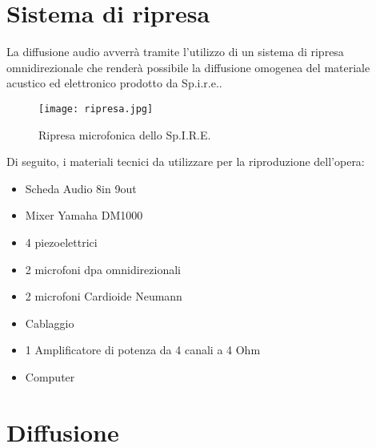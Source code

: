 \section{Sistema di ripresa}
La diffusione audio avverrà tramite l'utilizzo di un sistema di ripresa omnidirezionale che renderà possibile la diffusione omogenea del materiale acustico ed elettronico prodotto da Sp.i.r.e..
\begin{figure}[!htbp]
\begin{center}
\texttt{[image: ripresa.jpg]}
\caption{Ripresa microfonica dello Sp.I.R.E.}
\label{default}
\end{center}
\end{figure}
Di seguito, i materiali tecnici da utilizzare per la riproduzione dell'opera:
\begin{itemize}
	\item{Scheda Audio 8in 9out}
	\item{Mixer Yamaha DM1000}
	\item{4 piezoelettrici}
	\item{2 microfoni dpa omnidirezionali}
	\item{2 microfoni Cardioide Neumann}
	\item{Cablaggio}
	\item{1 Amplificatore di potenza da 4 canali a 4 Ohm}
	\item{Computer\\}
\end{itemize}

\section{Diffusione} 

